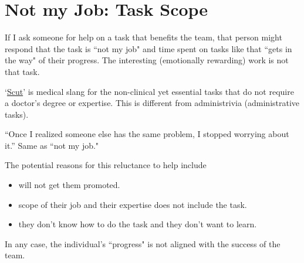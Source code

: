 \section{Not my Job: Task Scope}


If I ask someone for help on a task that benefits the team, that person might respond that the task is ``not my job" and time spent on tasks like that ``gets in the way" of their progress. The interesting (emotionally rewarding) work is not that task.

`\href{https://www.urbandictionary.com/define.php?term=scut}{Scut}' is medical slang for the non-clinical yet essential tasks that do not require a doctor's degree or expertise.
This is different from administrivia (administrative tasks).

``Once I realized someone else has the same problem, I stopped worrying about it.'' Same as ``not my job."

The potential reasons for this reluctance to help include
\begin{itemize}
    \item will not get them promoted.
    \item scope of their job and their expertise does not include the task.
    \item they don't know how to do the task and they don't want to learn.
\end{itemize}
In any case, the individual's ``progress" is not aligned with the success of the team.